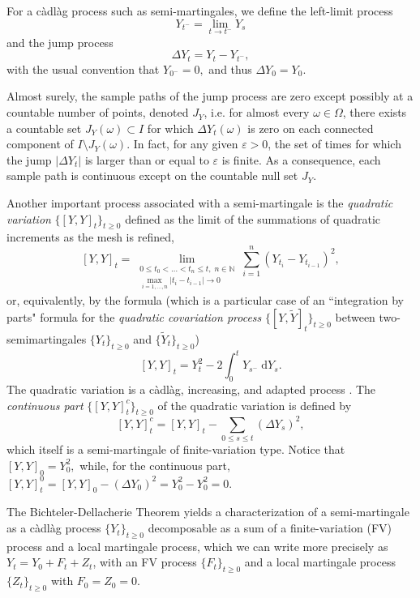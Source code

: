 \documentclass[reqno,12pt]{amsart}
\theoremstyle{plain} %
\theoremstyle{definition} %
\begin{document}
For a c\`adl\`ag process such as semi-martingales, we define the left-limit process
\begin{equation}
  Y_{t^{-}} = \lim_{t \rightarrow t^-} Y_s
\end{equation}
and the jump process
\begin{equation}
  \Delta Y_t = Y_t - Y_{t^{-}},
\end{equation}
with the usual convention that $Y_{0^-} = 0,$ and thus $\Delta Y_0 = Y_0.$

Almost surely, the sample paths of the jump process are zero except possibly at a countable number of points, denoted $J_{Y}$, i.e. for almost every $\omega\in \Omega$, there exists a countable set $J_{Y}(\omega) \subset I$ for which $\Delta Y_t(\omega)$ is zero on each connected component of $I\setminus J_{Y}(\omega)$. In fact, for any given $\varepsilon > 0$, the set of times for which the jump $|\Delta Y_t|$ is larger than or equal to $\varepsilon$ is finite. As a consequence, each sample path is continuous except on the countable null set $J_{Y}.$

Another important process associated with a semi-martingale is the \emph{quadratic variation} $\{[Y, Y]_t\}_{t\geq 0}$ defined as the limit of the summations of quadratic increments as the mesh is refined,
\[
    [Y, Y]_t = \lim_{\substack{0\leq t_0 < \ldots < t_n \leq t, \;n\in \mathbb{N} \\ \max_{i=1, \ldots, n}|t_i - t_{i-1}| \rightarrow 0}} \sum_{i=1}^n (Y_{t_i} - Y_{t_{i-1}})^2,
\]
or, equivalently, by the formula (which is a particular case of an ``integration by parts" formula for the \emph{quadratic covariation process} $\{[Y, \tilde Y]_t\}_{t\geq 0}$ between two-semimartingales $\{Y_t\}_{t\geq 0}$ and $\{\tilde Y_t\}_{t\geq 0}$)
\[
    [Y, Y]_t = Y_t^2 - 2\int_0^t Y_{s^-} \;\mathrm{d}Y_s.
\]
The quadratic variation is a c\`adl\`ag, increasing, and adapted process \cite[Theorem II.22]{Protter2005}. The \emph{continuous part} $\{[Y, Y]_t^c\}_{t\geq 0}$ of the quadratic variation is defined by
\[
    [Y, Y]_t^c = [Y, Y]_t - \sum_{0\leq s \leq t} \left(\Delta Y_s\right)^2,
\]
which itself is a semi-martingale of finite-variation type. Notice that $[Y, Y]_0 = Y_0^2,$ while, for the continuous part, $[Y, Y]_t^0 = [Y, Y]_0 - \left(\Delta Y_0\right)^2 = Y_0^2 - Y_0^2 = 0.$

The Bichteler-Dellacherie Theorem \cite[Theorem III.47]{Protter2005} yields a characterization of a semi-martingale as a c\`adl\`ag process $\{Y_t\}_{t\geq 0}$ decomposable as a sum of a finite-variation (FV) process and a local martingale process, which we can write more precisely as $Y_t = Y_0 + F_t + Z_t$, with an FV process $\{F_t\}_{t\geq 0}$ and a local martingale process $\{Z_t\}_{t\geq 0}$ with $F_0 = Z_0 = 0.$
\end{document}
